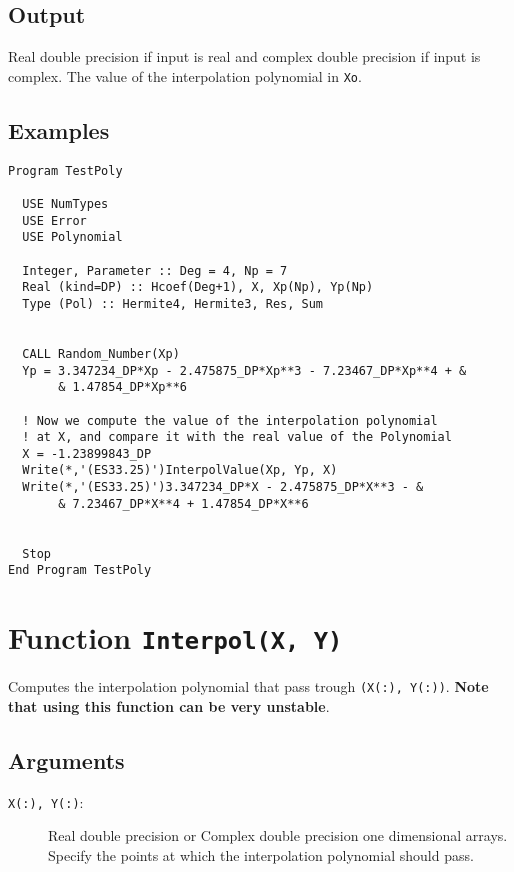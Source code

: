 \subsection{Output}

Real double precision if input is real and complex double precision if
input is complex. The value of the interpolation polynomial in
\texttt{Xo}. 


\subsection{Examples}

\begin{lstlisting}[emph=InterpolValue,
                   emphstyle=\color{blue},
                   frame=trBL,
                   caption=Compute values of the Interpolation polynomial.,
                   label=interpolvalue]
Program TestPoly

  USE NumTypes
  USE Error
  USE Polynomial

  Integer, Parameter :: Deg = 4, Np = 7
  Real (kind=DP) :: Hcoef(Deg+1), X, Xp(Np), Yp(Np)
  Type (Pol) :: Hermite4, Hermite3, Res, Sum


  CALL Random_Number(Xp)
  Yp = 3.347234_DP*Xp - 2.475875_DP*Xp**3 - 7.23467_DP*Xp**4 + &
       & 1.47854_DP*Xp**6

  ! Now we compute the value of the interpolation polynomial
  ! at X, and compare it with the real value of the Polynomial
  X = -1.23899843_DP
  Write(*,'(ES33.25)')InterpolValue(Xp, Yp, X)
  Write(*,'(ES33.25)')3.347234_DP*X - 2.475875_DP*X**3 - &
       & 7.23467_DP*X**4 + 1.47854_DP*X**6


  Stop
End Program TestPoly
\end{lstlisting}

\section{Function \texttt{Interpol(X, Y)}}

Computes the interpolation polynomial that pass trough
\texttt{(X(:), Y(:))}. \textbf{Note that using this function can be
very unstable}.

\subsection{Arguments}

\begin{description}
\item[\texttt{X(:), Y(:)}:] Real double precision or Complex double
  precision one dimensional arrays. Specify the points at which the
  interpolation polynomial should pass. 
\end{description}

